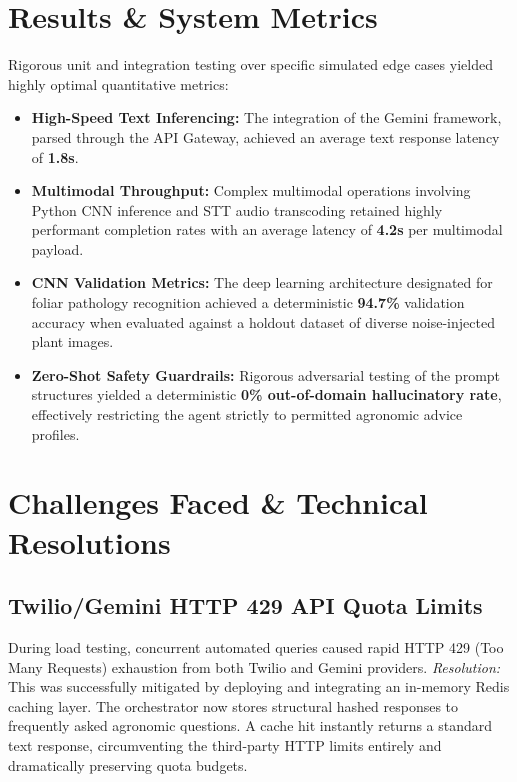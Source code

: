 \documentclass[12pt, a4paper]{report}
\begin{document}
\section{Results \& System Metrics}
Rigorous unit and integration testing over specific simulated edge cases yielded highly optimal quantitative metrics:
\begin{itemize}
    \item \textbf{High-Speed Text Inferencing:} The integration of the Gemini framework, parsed through the API Gateway, achieved an average text response latency of \textbf{1.8s}.
    \item \textbf{Multimodal Throughput:} Complex multimodal operations involving Python CNN inference and STT audio transcoding retained highly performant completion rates with an average latency of \textbf{4.2s} per multimodal payload.
    \item \textbf{CNN Validation Metrics:} The deep learning architecture designated for foliar pathology recognition achieved a deterministic \textbf{94.7\%} validation accuracy when evaluated against a holdout dataset of diverse noise-injected plant images.
    \item \textbf{Zero-Shot Safety Guardrails:} Rigorous adversarial testing of the prompt structures yielded a deterministic \textbf{0\% out-of-domain hallucinatory rate}, effectively restricting the agent strictly to permitted agronomic advice profiles.
\end{itemize}

\section{Challenges Faced \& Technical Resolutions}

\subsection*{Twilio/Gemini HTTP 429 API Quota Limits}
During load testing, concurrent automated queries caused rapid HTTP 429 (Too Many Requests) exhaustion from both Twilio and Gemini providers.
\textit{Resolution:} This was successfully mitigated by deploying and integrating an in-memory Redis caching layer. The orchestrator now stores structural hashed responses to frequently asked agronomic questions. A cache hit instantly returns a standard text response, circumventing the third-party HTTP limits entirely and dramatically preserving quota budgets.
\end{document}
